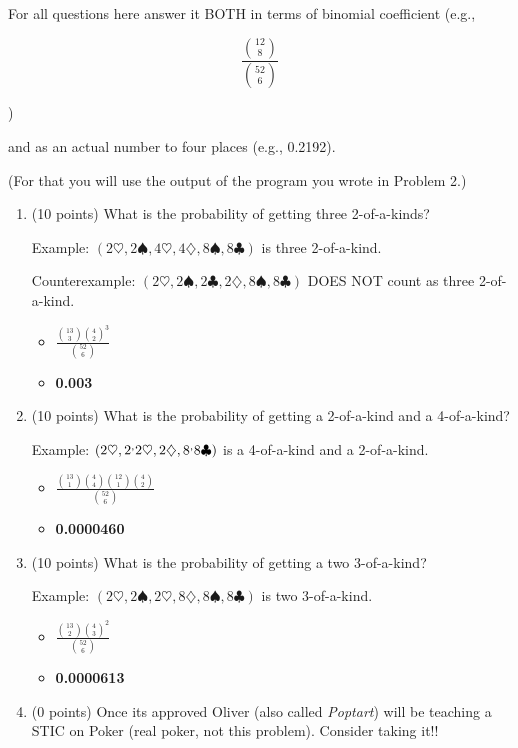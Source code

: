 \documentclass[12pt]{article}
\begin{document}
\begin{enumerate}
For all questions here answer it BOTH in terms of binomial coefficient
(e.g., 

$$\frac{\binom{12}{8}}{{\binom{52}{6}}}$$

)

and as an actual number to four places (e.g., 0.2192). 

(For that you will use the output of the program you wrote
in Problem 2.) 

\begin{enumerate}
\item
(10 points) 
What is the probability of getting three 2-of-a-kinds?

\newcommand{\he}{\heartsuit}
\newcommand{\spa}{\spadesuit}
\newcommand{\cl}{\clubsuit}
\newcommand{\di}{\diamondsuit}

Example: $(2\he, 2\spa, 4\he, 4\di, 8\spa, 8\cl)$ is three 2-of-a-kind. 

Counterexample: $(2\he, 2\spa, 2\cl, 2\di, 8\spa, 8\cl)$ DOES NOT count as three 2-of-a-kind. 
\begin{itemize}
    \item \textbf{$\frac{\binom{13}{3} \binom{4}{2}^3}{\binom{52}{6}}$}
    \item \textbf{0.003}
\end{itemize}

\item 
(10 points) 
What is the probability of getting a 2-of-a-kind and a 4-of-a-kind? 

Example: $(2\he, 2\sp, 2\he, 2\di, 8\sp, 8\cl)$ is a 4-of-a-kind and a 2-of-a-kind. 
\begin{itemize}
    \item \textbf{$\frac{\binom{13}{1} \binom{4}{4} \binom{12}{1} \binom{4}{2}}{\binom{52}{6}}$}
    \item \textbf{0.0000460}
\end{itemize}

\item 
(10 points) 
What is the probability of getting a two 3-of-a-kind?

Example: $(2\he, 2\spa, 2\he, 8\di, 8\spa, 8\cl)$ is two 3-of-a-kind. 
\begin{itemize}
    \item \textbf{$\frac{\binom{13}{2} \binom{4}{3}^2}{\binom{52}{6}}$}
    \item \textbf{0.0000613}
\end{itemize}

\item
(0 points) Once its approved Oliver (also called {\it Poptart}) will be teaching a
STIC on Poker (real poker, not this problem). Consider taking it!!


\end{enumerate}
\end{enumerate}
\end{document}
